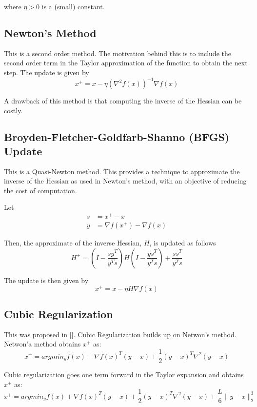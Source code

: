 \documentclass{article}
\begin{document}
where $\eta > 0$ is a (small) constant.

\subsection{Newton's Method}
This is a second order method. The motivation behind this is to include the second order term in the Taylor approximation of the function to obtain the next step. The update is given by
\begin{equation}
x^+ = x - \eta \left(\nabla^2 f(x) \right)^{-1}\nabla f(x)
\end{equation}

A drawback of this method is that computing the inverse of the Hessian can be costly.

\subsection{Broyden-Fletcher-Goldfarb-Shanno (BFGS) Update}
This is a Quasi-Newton method. This provides a technique to approximate the inverse of the Hessian as used in Newton's method, with an objective of reducing the cost of computation.

Let
\begin{align}
s &= x^+ - x \\
y &= \nabla f(x^+) - \nabla f(x)
\end{align}

Then, the approximate of the inverse Hessian, $H$, is updated as follows
\begin{equation}
H^+ = \left(I - \frac{sy^T}{y^Ts}\right)H\left(I-\frac{ys^T}{y^Ts}\right)+\frac{ss^T}{y^Ts}
\end{equation}

The update is then given by
\begin{equation}
x^+ = x - \eta H \nabla f(x)
\end{equation}

\subsection{Cubic Regularization}
This was proposed in []. Cubic Regularization builds up on Netwon's method. Netwon'a method obtains $x^+$ as:
\begin{equation}
	x^+ = argmin_y f(x) + \nabla f(x)^T (y-x) + \frac12 (y-x)^T \nabla^2 (y-x)
\end{equation}

Cubic regularization goes one term forward in the Taylor expansion and obtains $x^+$ as:
\begin{equation}
x^+ = argmin_y f(x) + \nabla f(x)^T (y-x) + \frac12 (y-x)^T \nabla^2 (y-x) + \frac{L}{6}\lVert y-x \rVert_2^3
\end{equation}
\end{document}
